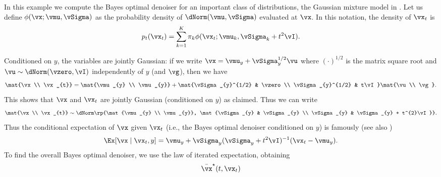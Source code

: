 \documentclass[../../book-main.tex]{subfiles}
\begin{document}
\begin{example}\label{example:denoising_gaussian_mixture}
    In this example we compute the Bayes optimal denoiser for an
    important class of distributions, the Gaussian mixture
    model in . Let us define \(\phi(\vx ;
    \vmu, \vSigma)\) as the probability density of \(\dNorm(\vmu,
    \vSigma)\) evaluated at \(\vx\). In this notation, the density of
    \(\vx_{t}\) is
    \begin{equation}
        p_{t}(\vx_{t}) = \sum_{k = 1}^{K}\pi_{k}\phi(\vx_{t} ;
        \vmu_{k}, \vSigma_{k} + t^{2}\vI).
    \end{equation}

    Conditioned on \(y\), the variables are jointly Gaussian: if we
    write \(\vx = \vmu_{y} + \vSigma_{y}^{1/2}\vu\) where
    \((\cdot)^{1/2}\) is the matrix square root and \(\vu \sim
    \dNorm(\vzero, \vI)\) independently of \(y\) (and \(\vg\)), then we have
    \begin{equation}
        \mat{\vx \\ \vx_{t}} = \mat{\vmu_{y} \\ \vmu_{y}} +
        \mat{\vSigma_{y}^{1/2} & \vzero \\ \vSigma_{y}^{1/2} &
        t\vI}\mat{\vu \\ \vg}.
    \end{equation}
    This shows that \(\vx\) and \(\vx_{t}\) are jointly Gaussian
    (conditioned on \(y\)) as claimed. Thus we can write
    \begin{equation}
        \mat{\vx \\ \vx_{t}} \sim \dNorm\rp{\mat{\vmu_{y}
            \\ \vmu_{y}}, \mat{\vSigma_{y} & \vSigma_{y} \\ \vSigma_{y} &
        \vSigma_{y} + t^{2}\vI}}.
    \end{equation}
    Thus the conditional expectation of \(\vx\) given \(\vx_{t}\) (i.e., the
    Bayes optimal denoiser conditioned on \(y\)) is famously
    (see also )
    \begin{equation}
        \Ex[\vx \mid \vx_{t}, y] = \vmu_{y} + \vSigma_{y}(\vSigma_{y}
        + t^{2}\vI)^{-1}(\vx_{t} - \vmu_{y}).
    \end{equation}
    To find the overall Bayes optimal denoiser, we use the law of
    iterated expectation, obtaining
    \begin{align}
        \bar{\vx}^{\star}(t, \vx_{t})

\end{align}
\end{example}
\end{document}
